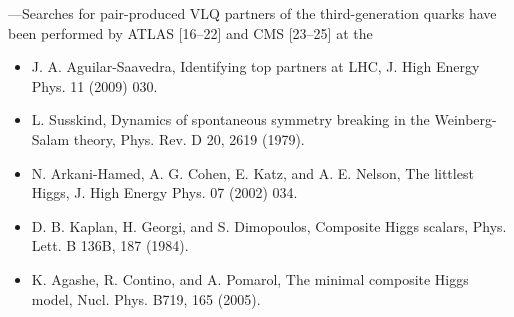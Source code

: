 —Searches for pair-produced
VLQ partners of the third-generation quarks have been
performed by ATLAS [16–22] and CMS [23–25] at the









\begin{itemize}
    \item J. A. Aguilar-Saavedra, Identifying top partners at LHC,
J. High Energy Phys. 11 (2009) 030.
\item  L. Susskind, Dynamics of spontaneous symmetry breaking
in the Weinberg-Salam theory, Phys. Rev. D 20, 2619
(1979).
\item N. Arkani-Hamed, A. G. Cohen, E. Katz, and A. E. Nelson,
The littlest Higgs, J. High Energy Phys. 07 (2002) 034.
\item  D. B. Kaplan, H. Georgi, and S. Dimopoulos, Composite
Higgs scalars, Phys. Lett. B 136B, 187 (1984).
\item K. Agashe, R. Contino, and A. Pomarol, The minimal
composite Higgs model, Nucl. Phys. B719, 165 (2005).



\end{itemize}

